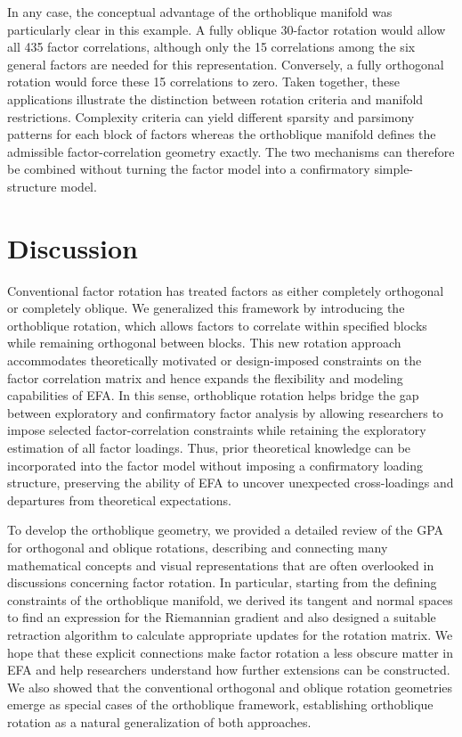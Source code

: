 \documentclass[
  12pt,
  letterpaper,
  article]{scrartcl}
\begin{document}
In any case, the conceptual advantage of the orthoblique manifold was
particularly clear in this example. A fully oblique 30-factor rotation
would allow all 435 factor correlations, although only the 15
correlations among the six general factors are needed for this
representation. Conversely, a fully orthogonal rotation would force
these 15 correlations to zero. Taken together, these applications
illustrate the distinction between rotation criteria and manifold
restrictions. Complexity criteria can yield different sparsity and
parsimony patterns for each block of factors whereas the orthoblique
manifold defines the admissible factor-correlation geometry exactly. The
two mechanisms can therefore be combined without turning the factor
model into a confirmatory simple-structure model.

\section{Discussion}\label{discussion}

Conventional factor rotation has treated factors as either completely
orthogonal or completely oblique. We generalized this framework by
introducing the orthoblique rotation, which allows factors to correlate
within specified blocks while remaining orthogonal between blocks. This
new rotation approach accommodates theoretically motivated or
design-imposed constraints on the factor correlation matrix and hence
expands the flexibility and modeling capabilities of EFA. In this sense,
orthoblique rotation helps bridge the gap between exploratory and
confirmatory factor analysis by allowing researchers to impose selected
factor-correlation constraints while retaining the exploratory
estimation of all factor loadings. Thus, prior theoretical knowledge can
be incorporated into the factor model without imposing a confirmatory
loading structure, preserving the ability of EFA to uncover unexpected
cross-loadings and departures from theoretical expectations.

To develop the orthoblique geometry, we provided a detailed review of
the GPA for orthogonal and oblique rotations, describing and connecting
many mathematical concepts and visual representations that are often
overlooked in discussions concerning factor rotation. In particular,
starting from the defining constraints of the orthoblique manifold, we
derived its tangent and normal spaces to find an expression for the
Riemannian gradient and also designed a suitable retraction algorithm to
calculate appropriate updates for the rotation matrix. We hope that
these explicit connections make factor rotation a less obscure matter in
EFA and help researchers understand how further extensions can be
constructed. We also showed that the conventional orthogonal and oblique
rotation geometries emerge as special cases of the orthoblique
framework, establishing orthoblique rotation as a natural generalization
of both approaches.
\end{document}
